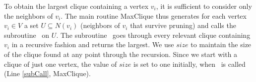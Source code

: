 To obtain the largest clique containing a vertex $v_i$, 
it is sufficient to consider only the neighbors of $v_i$. 
The main routine {\sc MaxClique} thus generates  for each 
vertex $v_i \in V$ a set $U \subseteq N(v_i)$ 
(neighbors of $v_i$ that survive pruning) and calls the subroutine \clq\ on $U$.  
The subroutine \clq\ goes through every relevant clique containing $v_i$ 
in a recursive fashion and returns the largest.
We use $size$ to maintain the size of the clique found at any point through the recursion.
Since we start with a clique of just one vertex, the value of $size$ is set to one initially, 
when \clq\ is called (Line \ref{subCall}, {\sc MaxClique}).




%
%


